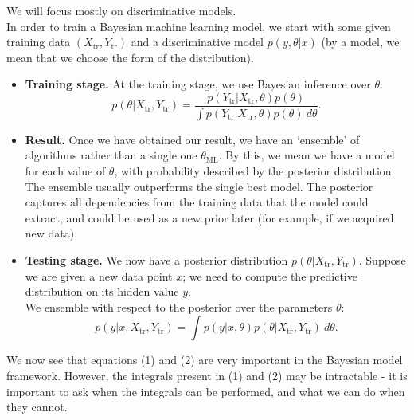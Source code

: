 We will focus mostly on discriminative models.\\

In order to train a Bayesian machine learning model, we start with some given training data $(X_{\text{tr}}, Y_{\text{tr}})$ and a discriminative model $p(y,\theta | x)$ (by a model, we mean that we choose the form of the distribution). 
\begin{itemize}
\item \textbf{Training stage.} At the training stage, we use Bayesian inference over $\theta$:
\begin{equation*}
\tag{1}
p(\theta | X_{\text{tr}}, Y_{\text{tr}}) = \frac{p(Y_{\text{tr}} | X_{\text{tr}}, \theta) p(\theta)}{\displaystyle \int p(Y_{\text{tr}} | X_{\text{tr}}, \theta) p(\theta)\ d\theta}.
\end{equation*}
\item \textbf{Result.} Once we have obtained our result, we have an `ensemble' of algorithms rather than a single one $\theta_{\text{ML}}$. By this, we mean we have a model for each value of $\theta$, with probability described by the posterior distribution.\\

The ensemble usually outperforms the single best model. The posterior captures all dependencies from the training data that the model could extract, and could be used as a new prior later (for example, if we acquired new data).
\item \textbf{Testing stage.} We now have a posterior distribution $p(\theta | X_{\text{tr}}, Y_{\text{tr}})$. Suppose we are given a new data point $x$; we need to compute the predictive distribution on its hidden value $y$.\\

We ensemble with respect to the posterior over the parameters $\theta$:
\begin{equation*}
\tag{2}
p(y | x, X_{\text{tr}}, Y_{\text{tr}}) = \int p(y|x,\theta) p(\theta | X_{\text{tr}}, Y_{\text{tr}}) \ d\theta.
\end{equation*}
\end{itemize}

We now see that equations (1) and (2) are very important in the Bayesian model framework. However, the integrals present in (1) and (2) may be intractable - it is important to ask when the integrals can be performed, and what we can do when they cannot.




\newpage
